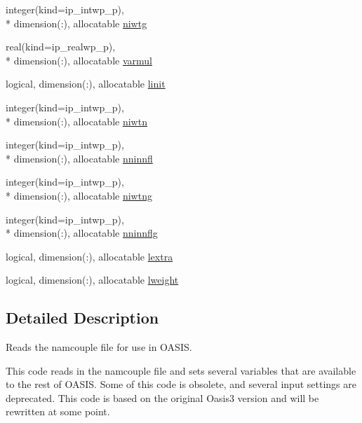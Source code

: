 \begin{DoxyCompactItemize}
\item 
integer(kind=ip\+\_\+intwp\+\_\+p), \\*
dimension(\+:), allocatable \hyperlink{classmod__oasis__namcouple_a28e887d61cc4b10c00c33a7d0f51a275}{niwtg}
\item 
real(kind=ip\+\_\+realwp\+\_\+p), \\*
dimension(\+:), allocatable \hyperlink{classmod__oasis__namcouple_ab7c38fd6bd90bb8e6ebfb539ead1f1a9}{varmul}
\item 
logical, dimension(\+:), allocatable \hyperlink{classmod__oasis__namcouple_ac124af3aecadc7ba436f2ee6caffee9a}{linit}
\item 
integer(kind=ip\+\_\+intwp\+\_\+p), \\*
dimension(\+:), allocatable \hyperlink{classmod__oasis__namcouple_a63c2f2977f9cc4839f6bdec7bbbc5fa7}{niwtn}
\item 
integer(kind=ip\+\_\+intwp\+\_\+p), \\*
dimension(\+:), allocatable \hyperlink{classmod__oasis__namcouple_a579387e570e26f2d6c6c2159824cf8a3}{nninnfl}
\item 
integer(kind=ip\+\_\+intwp\+\_\+p), \\*
dimension(\+:), allocatable \hyperlink{classmod__oasis__namcouple_a3379333e7d0f24b776c81b1087f3a3b4}{niwtng}
\item 
integer(kind=ip\+\_\+intwp\+\_\+p), \\*
dimension(\+:), allocatable \hyperlink{classmod__oasis__namcouple_a6526a92cd5fa662f9da229806d062dc2}{nninnflg}
\item 
logical, dimension(\+:), allocatable \hyperlink{classmod__oasis__namcouple_a2febd0d97dea9ecc3ce4a8c5088a8d1f}{lextra}
\item 
logical, dimension(\+:), allocatable \hyperlink{classmod__oasis__namcouple_a8d88d0c1b22ea43a9429f9e3a653a64b}{lweight}
\end{DoxyCompactItemize}


\subsection{Detailed Description}
Reads the namcouple file for use in O\+A\+S\+I\+S. 

This code reads in the namcouple file and sets several variables that are available to the rest of O\+A\+S\+I\+S. Some of this code is obsolete, and several input settings are deprecated. This code is based on the original Oasis3 version and will be rewritten at some point. 

